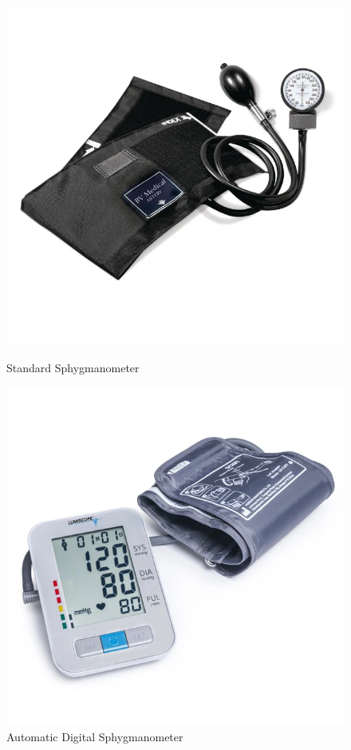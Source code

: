 \begin{figure}[h]
    \centering
    \includegraphics[scale=0.2]{images/abp/sphyg}
    \caption{Standard Sphygmanometer \cite{StandardSphygmomanometer}}
    \label{fig:sphyg}
    \includegraphics[scale=0.2]{images/abp/auto_sphyg}
    \caption{Automatic Digital Sphygmanometer \cite{AutomaticDigitalBlood}}
    \label{fig:auto_sphyg}
\end{figure}

